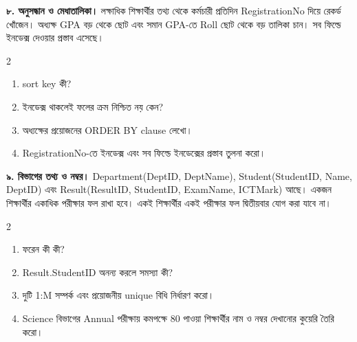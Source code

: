 \textbf{৮. অনুসন্ধান ও মেধাতালিকা।} লক্ষাধিক শিক্ষার্থীর তথ্য থেকে কর্মচারী প্রতিদিন RegistrationNo দিয়ে রেকর্ড খোঁজেন। অধ্যক্ষ GPA বড় থেকে ছোট এবং সমান GPA-তে Roll ছোট থেকে বড় তালিকা চান। সব ফিল্ডে ইনডেক্স দেওয়ার প্রস্তাব এসেছে।
\begin{multicols}{2}
\begin{enumerate}
\item[ক.] \begin{minipage}[t]{\linewidth}sort key কী?
\end{minipage}
\item[খ.] \begin{minipage}[t]{\linewidth}ইনডেক্স থাকলেই ফলের ক্রম নিশ্চিত নয় কেন?
\end{minipage}
\item[গ.] \begin{minipage}[t]{\linewidth}অধ্যক্ষের প্রয়োজনের ORDER BY clause লেখো।
\end{minipage}
\item[ঘ.] \begin{minipage}[t]{\linewidth}RegistrationNo-তে ইনডেক্স এবং সব ফিল্ডে ইনডেক্সের প্রস্তাব তুলনা করো।
\end{minipage}
\end{enumerate}
\end{multicols}

\textbf{৯. বিভাগের তথ্য ও নম্বর।} Department(DeptID, DeptName), Student(StudentID, Name, DeptID) এবং Result(ResultID, StudentID, ExamName, ICTMark) আছে। একজন শিক্ষার্থীর একাধিক পরীক্ষার ফল রাখা হবে। একই শিক্ষার্থীর একই পরীক্ষার ফল দ্বিতীয়বার যোগ করা যাবে না।
\begin{multicols}{2}
\begin{enumerate}
\item[ক.] \begin{minipage}[t]{\linewidth}ফরেন কী কী?
\end{minipage}
\item[খ.] \begin{minipage}[t]{\linewidth}Result.StudentID অনন্য করলে সমস্যা কী?
\end{minipage}
\item[গ.] \begin{minipage}[t]{\linewidth}দুটি 1:M সম্পর্ক এবং প্রয়োজনীয় unique বিধি নির্ধারণ করো।
\end{minipage}
\item[ঘ.] \begin{minipage}[t]{\linewidth}Science বিভাগের Annual পরীক্ষায় কমপক্ষে 80 পাওয়া শিক্ষার্থীর নাম ও নম্বর দেখানোর কুয়েরি তৈরি করো।
\end{minipage}
\end{enumerate}
\end{multicols}

